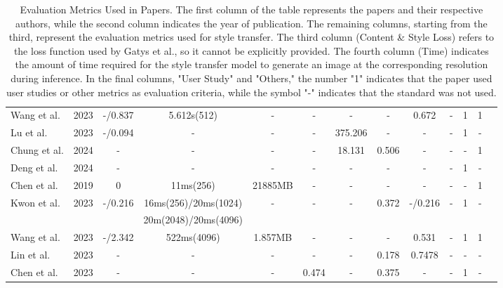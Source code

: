 \documentclass[preprint,12pt]{elsarticle}
\begin{document}
\begin{table}[t]
{\begin{tabular}{lcccccccccccc}
                Wang et al.\citep{64wang2023stylediffusion} & 2023 &-/0.837 & 5.612s(512) & - & - & - & - & 0.672 & - & 1 & 1\\
                Lu et al.\citep{65lu2023specialist} & 2023 &-/0.094 & - & - & - & 375.206 & - & - & - & 1 & -\\
                Chung et al.\citep{66chung2024style} & 2024 &- & - & - & - & 18.131 & 0.506 & - & - & - & 1\\
                Deng et al.\citep{67deng2024z} & 2024 &- & - & - & - & - & - & - & - & 1 & -\\
                Chen et al.\citep{70chen2019drop} & 2019 &0 & 11ms(256) & 21885MB & - & - & - & - & - & - & 1\\
                \multirow{2}{*}{Kwon et al.\citep{71kwon2024aesfa}} & \multirow{2}{*}{2023}&\multirow{2}{*}{-/0.216} & 16ms(256)/20ms(1024)& \multirow{2}{*}{-} & \multirow{2}{*}{-} & \multirow{2}{*}{-} & \multirow{2}{*}{0.372 }& \multirow{2}{*}{-/0.216}& \multirow{2}{*}{-} & 1 & \multirow{2}{*}{-}\\
                 & & &20m(2048)/20ms(4096) &  &  &  & & &  &  & \\
                Wang et al.\citep{72wang2023microast} & 2023 &-/2.342 & 522ms(4096) & 1.857MB & - & - & - & 0.531 & - & 1 & 1\\
                Lin et al.\citep{78lin2023adacm} & 2023 &- & - & - & - & - & 0.178 & 0.7478 & - & - & -\\
                Chen et al.\citep{80cheng2023user} & 2023 &- & - & - & 0.474 & - & 0.375 & - & - & 1 & -\\
                \bottomrule
            \end{tabular}
    }
    \caption{Evaluation Metrics Used in Papers. The first column of the table represents the papers and their respective authors, while the second column indicates the year of publication. The remaining columns, starting from the third, represent the evaluation metrics used for style transfer. The third column (Content \& Style Loss) refers to the loss function used by Gatys et al., so it cannot be explicitly provided. The fourth column (Time) indicates the amount of time required for the style transfer model to generate an image at the corresponding resolution during inference. In the final columns, "User Study" and "Others," the number "1" indicates that the paper used user studies or other metrics as evaluation criteria, while the symbol "-" indicates that the standard was not used.}\label{table1_Evaluation}
\end{table}
\end{document}
